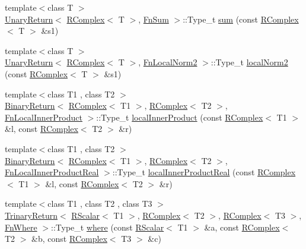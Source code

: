 \begin{DoxyCompactItemize}
{\footnotesize template$<$class T $>$ }\\\mbox{\hyperlink{structENSEM_1_1UnaryReturn}{Unary\+Return}}$<$ \mbox{\hyperlink{classENSEM_1_1RComplex}{R\+Complex}}$<$ T $>$, \mbox{\hyperlink{structENSEM_1_1FnSum}{Fn\+Sum}} $>$\+::Type\+\_\+t \mbox{\hyperlink{group__rcomplex_ga402ccaab21c1a8ce0e99c8d2b1ee1c53}{sum}} (const \mbox{\hyperlink{classENSEM_1_1RComplex}{R\+Complex}}$<$ T $>$ \&s1)
\item 
{\footnotesize template$<$class T $>$ }\\\mbox{\hyperlink{structENSEM_1_1UnaryReturn}{Unary\+Return}}$<$ \mbox{\hyperlink{classENSEM_1_1RComplex}{R\+Complex}}$<$ T $>$, \mbox{\hyperlink{structENSEM_1_1FnLocalNorm2}{Fn\+Local\+Norm2}} $>$\+::Type\+\_\+t \mbox{\hyperlink{group__rcomplex_gaeb6b484f4bb6decc4552e2c635452b3f}{local\+Norm2}} (const \mbox{\hyperlink{classENSEM_1_1RComplex}{R\+Complex}}$<$ T $>$ \&s1)
\item 
{\footnotesize template$<$class T1 , class T2 $>$ }\\\mbox{\hyperlink{structENSEM_1_1BinaryReturn}{Binary\+Return}}$<$ \mbox{\hyperlink{classENSEM_1_1RComplex}{R\+Complex}}$<$ T1 $>$, \mbox{\hyperlink{classENSEM_1_1RComplex}{R\+Complex}}$<$ T2 $>$, \mbox{\hyperlink{structENSEM_1_1FnLocalInnerProduct}{Fn\+Local\+Inner\+Product}} $>$\+::Type\+\_\+t \mbox{\hyperlink{group__rcomplex_ga4ccc8c0a3c54b7eb19e0d5aa1c6ac89d}{local\+Inner\+Product}} (const \mbox{\hyperlink{classENSEM_1_1RComplex}{R\+Complex}}$<$ T1 $>$ \&l, const \mbox{\hyperlink{classENSEM_1_1RComplex}{R\+Complex}}$<$ T2 $>$ \&r)
\item 
{\footnotesize template$<$class T1 , class T2 $>$ }\\\mbox{\hyperlink{structENSEM_1_1BinaryReturn}{Binary\+Return}}$<$ \mbox{\hyperlink{classENSEM_1_1RComplex}{R\+Complex}}$<$ T1 $>$, \mbox{\hyperlink{classENSEM_1_1RComplex}{R\+Complex}}$<$ T2 $>$, \mbox{\hyperlink{structENSEM_1_1FnLocalInnerProductReal}{Fn\+Local\+Inner\+Product\+Real}} $>$\+::Type\+\_\+t \mbox{\hyperlink{group__rcomplex_ga1480abb301211dfb7c0071739fce6a6a}{local\+Inner\+Product\+Real}} (const \mbox{\hyperlink{classENSEM_1_1RComplex}{R\+Complex}}$<$ T1 $>$ \&l, const \mbox{\hyperlink{classENSEM_1_1RComplex}{R\+Complex}}$<$ T2 $>$ \&r)
\item 
{\footnotesize template$<$class T1 , class T2 , class T3 $>$ }\\\mbox{\hyperlink{structENSEM_1_1TrinaryReturn}{Trinary\+Return}}$<$ \mbox{\hyperlink{classENSEM_1_1RScalar}{R\+Scalar}}$<$ T1 $>$, \mbox{\hyperlink{classENSEM_1_1RComplex}{R\+Complex}}$<$ T2 $>$, \mbox{\hyperlink{classENSEM_1_1RComplex}{R\+Complex}}$<$ T3 $>$, \mbox{\hyperlink{structENSEM_1_1FnWhere}{Fn\+Where}} $>$\+::Type\+\_\+t \mbox{\hyperlink{group__rcomplex_ga1cdf9105d38ae9d995cba5874914982d}{where}} (const \mbox{\hyperlink{classENSEM_1_1RScalar}{R\+Scalar}}$<$ T1 $>$ \&a, const \mbox{\hyperlink{classENSEM_1_1RComplex}{R\+Complex}}$<$ T2 $>$ \&b, const \mbox{\hyperlink{classENSEM_1_1RComplex}{R\+Complex}}$<$ T3 $>$ \&c)

\end{DoxyCompactItemize}
